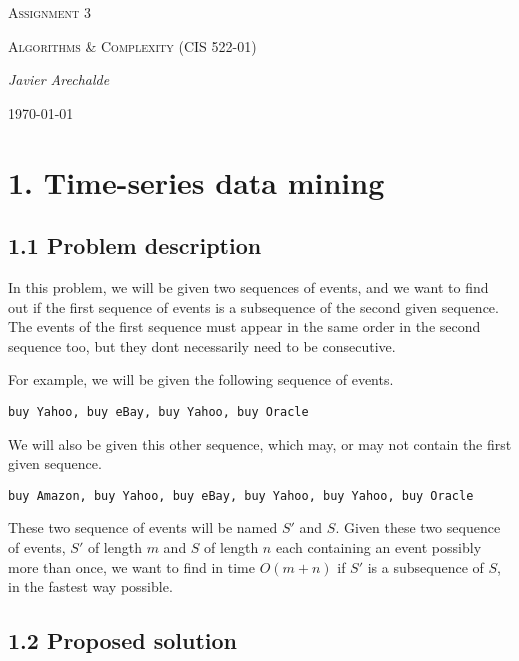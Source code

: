 \documentclass{article}
\begin{document}
\begin{titlepage}
	\centering
	{\scshape\LARGE Assignment 3\par}
	\vspace{1cm}
	{\scshape\Large Algorithms \& Complexity (CIS 522-01)\par}
	\vspace{1.5cm}
	{\Large\itshape Javier Arechalde\par}
	\vfill
	{\large \today\par}
\end{titlepage}

\section*{1. Time-series data mining}

\subsection*{1.1 Problem description}

In this problem, we will be given two sequences of events, and we want to find out if the first sequence of events is a subsequence of the second given sequence. The events of the first sequence must appear in the same order in the second sequence too, but they dont necessarily need to be consecutive.

For example, we will be given the following sequence of events.

\begin{center}
\texttt{buy Yahoo, buy eBay, buy Yahoo, buy Oracle}
\end{center}

We will also be given this other sequence, which may, or may not contain the first given sequence.

\begin{center}
\texttt{buy Amazon, buy Yahoo, buy eBay, buy Yahoo, buy Yahoo, buy Oracle}
\end{center}

These two sequence of events will be named $S'$ and $S$. Given these two sequence of events, $S'$ of length $m$ and $S$ of length $n$ each containing an event possibly more than once, we want to find in time $O(m+n)$ if $S'$ is a subsequence of $S$, in the fastest way possible.

\subsection*{1.2 Proposed solution}
\end{document}
